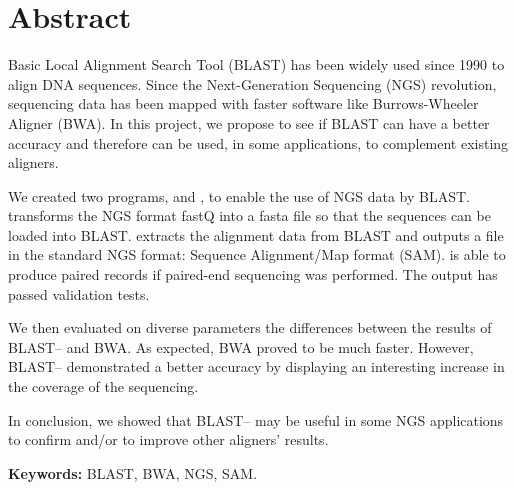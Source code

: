 \chapter*{Abstract}

Basic Local Alignment Search Tool (BLAST) has been widely used since 1990 to align DNA sequences.
Since the Next-Generation Sequencing (NGS) revolution, sequencing data has been mapped with faster software like Burrows-Wheeler Aligner (BWA).
In this project, we propose to see if BLAST can have a better accuracy and therefore can be used, in some applications, to complement existing aligners.

We created two programs, \fastqtofasta{} and \blastobam{}, to enable the use of NGS data by BLAST\@.
\fastqtofasta{} transforms the NGS format fastQ into a fasta file so that the sequences can be loaded into BLAST\@.
\blastobam{} extracts the alignment data from BLAST and outputs a file in the standard NGS format: Sequence Alignment\slash\hspace{0pt}Map format (SAM).
\blastobam{} is able to produce paired records if paired-end sequencing was performed.
The output has passed validation tests.

We then evaluated on diverse parameters the differences between the results of BLAST--\blastobam{} and BWA\@.
As expected, BWA proved to be much faster.
However, BLAST--\blastobam{} demonstrated a better accuracy by displaying an interesting increase in the coverage of the sequencing.

In conclusion, we showed that BLAST--\blastobam{} may be useful in some NGS applications to confirm and\slash\hspace{0pt}or to improve other aligners' results.
\bigskip

\textbf{Keywords:} BLAST, BWA, NGS, SAM\@.

